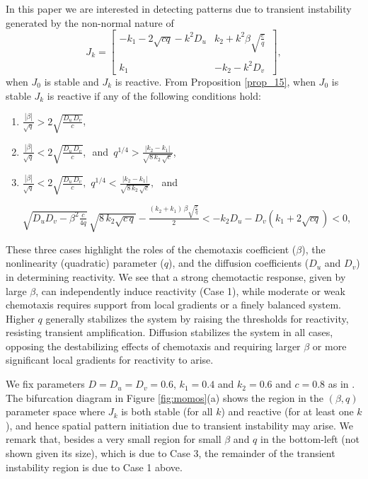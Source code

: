 \documentclass{article}
\newcommand{\jac}{J_{k}}
\begin{document}
In this paper we are interested in detecting  patterns due to transient instability generated by the non-normal nature of 
\[
\jac = \begin{bmatrix}
         -k_1-2\sqrt{c q} - k^2 D_u & k_2 + k^2 \beta \sqrt{\frac{c}{q}}\, \\\\
         k_1 & -k_2 - k^2 D_v
    \end{bmatrix},
\]
when \( J_{0} \) is stable {and} \( \jac \) is reactive. From Proposition \ref{prop_15}, when \( J_{0} \) is stable \( \jac \) is reactive if any of the following conditions hold:
\begin{enumerate}
    \item \( \frac{|\beta|}{\sqrt{q}}> 2 \sqrt{\frac{D_u\, D_v}{c}} \),
    \item \( \frac{|\beta|}{\sqrt{q}}< 2 \sqrt{\frac{D_u\, D_v}{c}} \), \,\,and \( \, q^{1/4} > \frac{|k_2 - k_1|}{\sqrt{8 \, k_2 \, \sqrt{c }}} \),
    \item 
    \(
        \frac{|\beta|}{\sqrt{q}}< 2 \sqrt{\frac{D_u\, D_v}{c}}, \,\, q^{1/4} < \frac{|k_2 - k_1|}{\sqrt{8 \, k_2 \, \sqrt{c }}},
    \)\,\, and
    
    \(         \sqrt{D_u D_v - \beta^2 \frac{c}{4q}} \, \sqrt{8 \, k_2 \sqrt{c\, q}} - \frac{(k_2 + k_1)\, \beta \sqrt{\frac{c}{q}}}{2} < -k_2 D_u - D_v (k_1 + 2 \sqrt{c q}) < 0 \),
\end{enumerate}

The{se} three {cases} highlight the roles of the chemotaxis coefficient ($\beta$), the nonlinearity (quadratic)  parameter ($q$), and the diffusion coefficients ($D_u$ and $D_v$) in determining reactivity. We see that a  
strong chemota{ctic response, given by large $\beta$,} can independently induce reactivity (Case 1), while moderate or weak chemotaxis requires support from local gradients or a finely balanced system.
 Higher $q$ generally stabilizes the system by raising the thresholds for reactivity, resisting transient amplification.
 Diffusion stabilizes the system in all cases, opposing the destabilizing effects of chemotaxis and requiring larger $\beta$ or more significant local gradients for reactivity to arise.



 We fix parameters $D=D_u=D_v=0.6$, $k_1=0.4$ and $k_2=0.6$ and $c=0.8$ as in \cite{noi}. The bifurcation diagram in Figure \ref{fig:momos}(a)  shows the region in the \((\beta, q)\) parameter space where $\jac$ is both stable (for all $k$)  and reactive (for at least one $k$), and {hence} spatial pattern initiation {due to transient instability} may arise. {We remark that, besides a very small region for small $\beta$ and $q$ in the bottom-left (not shown given its size), which is due to Case 3, the remainder of the transient instability region is due to Case 1 above. }
\end{document}
